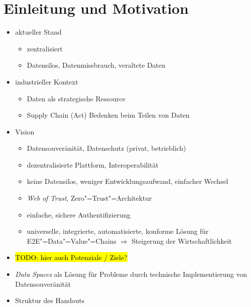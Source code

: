 
\section{Einleitung und Motivation}

\begin{itemize}
    \item aktueller Stand
    \begin{itemize}
        \item zentralisiert
        \item Datensilos, Datenmissbrauch, veraltete Daten
    \end{itemize}
    
    \item industrieller Kontext
    \begin{itemize}
        \item Daten als strategische Ressource
        \item Supply Chain (Act) Bedenken beim Teilen von Daten
    \end{itemize}

    \item Vision
    \begin{itemize}
        \item Datensouveränität, Datenschutz (privat, betrieblich)
        \item dezentralisierte Plattform, Interoperabilität
        \item keine Datensilos, weniger Entwicklungsaufwand, einfacher Wechsel
        \item \emph{Web of Trust}, Zero"=Trust"=Architektur
        \item einfache, sichere Authentifizierung
        \item universelle, integrierte, automatisierte, konforme Lösung für E2E"=Data"=Value"=Chains
              $\Rightarrow$ Steigerung der Wirtschaftlichkeit
    \end{itemize}

    \item \hl{TODO: hier auch Potenziale / Ziele?}

    \item \emph{Data Spaces} als Lösung für Probleme durch technische Implementierung von Datensouveränität
    \item Struktur des Handouts
\end{itemize}

\cite{sambraSolidPlatformDecentralized2016,bothSolidBasedB2BData2025,mecklerWebLinkedData2023,mollerIndustrialDataEcosystems2024}

